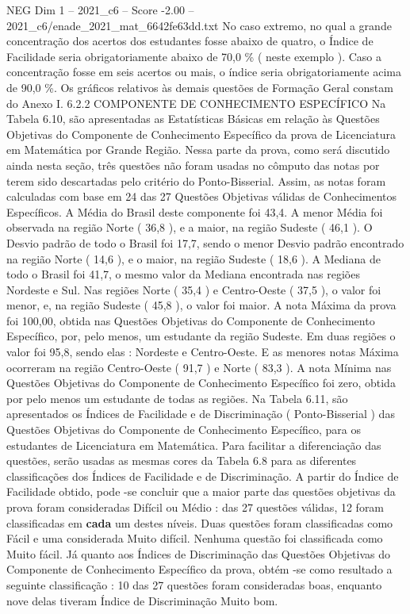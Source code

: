 \begin{textsample}{NEG Dim 1 – 2021\_c6 – Score -2.00 – 2021\_c6/enade\_2021\_mat\_6642fe63dd.txt}
No caso extremo, no qual a grande concentração dos acertos dos estudantes fosse abaixo de quatro, o Índice de Facilidade seria obrigatoriamente abaixo de 70,0 \% ( neste exemplo ).
Caso a concentração fosse em seis acertos ou mais, o índice seria obrigatoriamente acima de 90,0 \%.
Os gráficos relativos às demais questões de Formação Geral constam do Anexo I. 6.2.2 COMPONENTE DE CONHECIMENTO ESPECÍFICO Na Tabela 6.10, são apresentadas as Estatísticas Básicas em relação às Questões Objetivas do Componente de Conhecimento Específico da prova de Licenciatura em Matemática por Grande Região.
Nessa parte da prova, como será discutido ainda nesta seção, três questões não foram usadas no cômputo das notas por terem sido descartadas pelo critério do Ponto-Bisserial.
Assim, as notas foram calculadas com base em 24 das 27 Questões Objetivas válidas de Conhecimentos Específicos.
A Média do Brasil deste componente foi 43,4.
A menor Média foi observada na região Norte ( 36,8 ), e a maior, na região Sudeste ( 46,1 ).
O Desvio padrão de todo o Brasil foi 17,7, sendo o menor Desvio padrão encontrado na região Norte ( 14,6 ), e o maior, na região Sudeste ( 18,6 ).
A Mediana de todo o Brasil foi 41,7, o mesmo valor da Mediana encontrada nas regiões Nordeste e Sul.
Nas regiões Norte ( 35,4 ) e Centro-Oeste ( 37,5 ), o valor foi menor, e, na região Sudeste ( 45,8 ), o valor foi maior.
A nota Máxima da prova foi 100,00, obtida nas Questões Objetivas do Componente de Conhecimento Específico, por, pelo menos, um estudante da região Sudeste.
Em duas regiões o valor foi 95,8, sendo elas : Nordeste e Centro-Oeste.
E as menores notas Máxima ocorreram na região Centro-Oeste ( 91,7 ) e Norte ( 83,3 ).
A nota Mínima nas Questões Objetivas do Componente de Conhecimento Específico foi zero, obtida por pelo menos um estudante de todas as regiões.
Na Tabela 6.11, são apresentados os Índices de Facilidade e de Discriminação ( Ponto-Bisserial ) das Questões Objetivas do Componente de Conhecimento Específico, para os estudantes de Licenciatura em Matemática.
Para facilitar a diferenciação das questões, serão usadas as mesmas cores da Tabela 6.8 para as diferentes classificações dos Índices de Facilidade e de Discriminação.
A partir do Índice de Facilidade obtido, pode -se concluir que a maior parte das questões objetivas da prova foram consideradas Difícil ou Médio : das 27 questões válidas, 12 foram classificadas em \textbf{cada} um destes níveis.
Duas questões foram classificadas como Fácil e uma considerada Muito difícil.
Nenhuma questão foi classificada como Muito fácil.
Já quanto aos Índices de Discriminação das Questões Objetivas do Componente de Conhecimento Específico da prova, obtém -se como resultado a seguinte classificação : 10 das 27 questões foram consideradas boas, enquanto nove delas tiveram Índice de Discriminação Muito bom.

\end{textsample}
